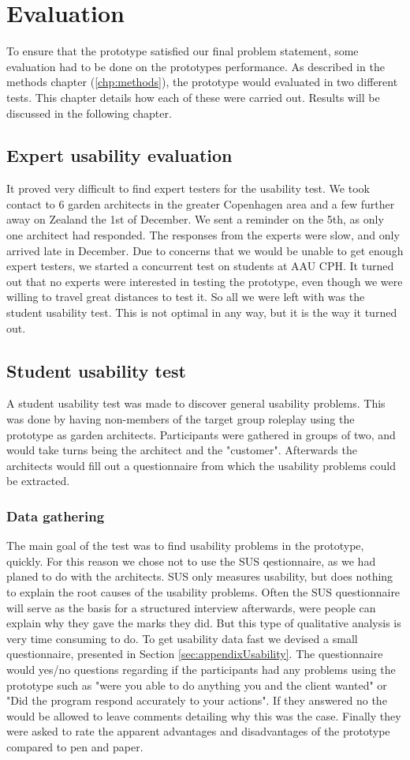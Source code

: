 \chapter{Evaluation}
To ensure that the prototype satisfied our final problem statement, some evaluation had to be done on the prototypes performance. As described in the methods chapter (\ref{chp:methods}), the prototype would evaluated in two different tests. This chapter details how each of these were carried out. Results will be discussed in the following chapter.

\section{Expert usability evaluation}
It proved very difficult to find expert testers for the usability test. We took contact to 6 garden architects in the greater Copenhagen area and a few further away on Zealand the 1st of December. We sent a reminder on the 5th, as only one architect had responded. The responses from the experts were slow, and only arrived late in December. Due to concerns that we would be unable to get enough expert testers, we started a concurrent test on students at AAU CPH. It turned out that no experts were interested in testing the prototype, even though we were willing to travel great distances to test it. So all we were left with was the student usability test. This is not optimal in any way, but it is the way it turned out.
\section{Student usability test}
A student usability test was made to discover general usability problems. This was done by having non-members of the target group roleplay using the prototype as garden architects. Participants were gathered in groups of two, and would take turns being the architect and the "customer". Afterwards the architects would fill out a questionnaire from which the usability problems could be extracted. 
\subsection{Data gathering}
The main goal of the test was to find usability problems in the prototype, quickly. For this reason we chose not to use the SUS qestionnaire, as we had planed to do with the architects. SUS only measures usability, but does nothing to explain the root causes of the usability problems. Often the SUS questionnaire will serve as the basis for a structured interview afterwards, were people can explain why they gave the marks they did. But this type of qualitative analysis is very time consuming to do. To get usability data fast we devised a small questionnaire, presented in Section \ref{sec:appendixUsability}. The questionnaire would yes/no questions regarding if the participants had any problems using the prototype such as "were you able to do anything you and the client wanted" or "Did the program respond accurately to your actions". If they answered no the would be allowed to leave comments detailing why this was the case. Finally they were asked to rate the apparent advantages and disadvantages of the prototype compared to pen and paper.
